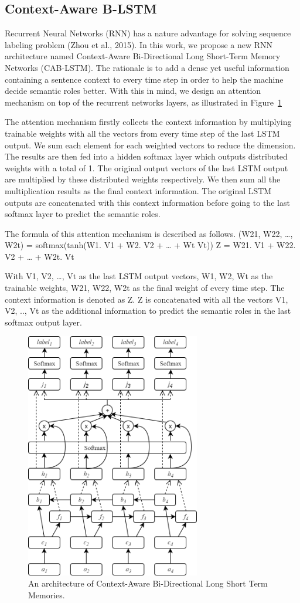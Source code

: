 \subsection{Context-Aware B-LSTM}
Recurrent Neural Networks (RNN) has a nature advantage for solving sequence labeling problem (Zhou et al., 2015). In this work, we propose a new RNN architecture named Context-Aware Bi-Directional Long Short-Term Memory Networks (CAB-LSTM). The rationale is to add a dense yet useful information containing a sentence context to every time step in order to help the machine decide semantic roles better. With this in mind, we design an attention mechanism on top of the recurrent networks layers, as illustrated in Figure~\ref{fig:cabilstm} 

The attention mechanism firstly collects the context information by multiplying trainable weights with all the vectors from every time step of the last LSTM output. We sum each element for each weighted vectors to reduce the dimension. The results are then fed into a hidden softmax layer which outputs distributed weights with a total of 1. The original output vectors of the last LSTM output are multiplied by these distributed weights respectively. We then sum all the multiplication results as the final context information. The original LSTM outputs are concatenated with this context information before going to the last softmax layer to predict the semantic roles.

The formula of this attention mechanism is described as follows.
(W21, W22, …, W2t) = softmax(tanh(W1. V1 + W2. V2 + … + Wt Vt))
Z = W21. V1 + W22. V2 + … + W2t. Vt

With V1, V2, …, Vt as the last LSTM output vectors, W1, W2, Wt as the trainable weights, W21, W22, W2t as the final weight of every time step. The context information is denoted as Z. Z is concatenated with all the vectors V1, V2, .., Vt as the additional information to predict the semantic roles in the last softmax output layer.

\begin{figure}
	\includegraphics[width=3in]{cabilstm}
	\caption{An architecture of Context-Aware Bi-Directional Long Short Term Memories.}
	\label{fig:cabilstm}
\end{figure}

